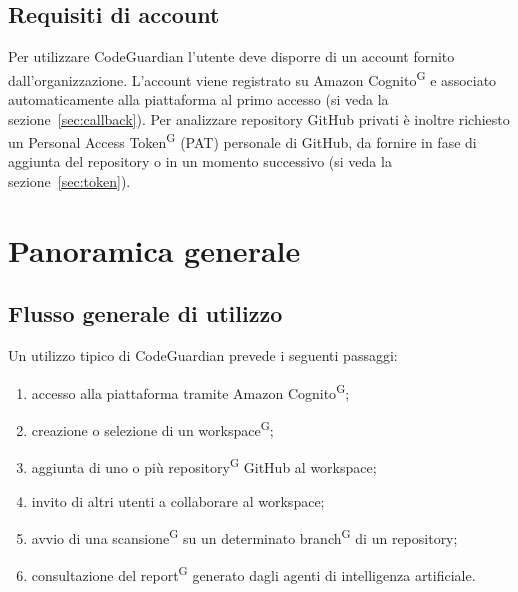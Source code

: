 \documentclass[a4paper, 11pt]{article}
\begin{document}
\subsection{Requisiti di account}
Per utilizzare CodeGuardian l'utente deve disporre di un account fornito dall'organizzazione. L'account viene registrato su Amazon Cognito\textsuperscript{G} e associato automaticamente alla piattaforma al primo accesso (si veda la sezione~\ref{sec:callback}).
Per analizzare repository GitHub privati è inoltre richiesto un Personal Access Token\textsuperscript{G} (PAT) personale di GitHub, da fornire in fase di aggiunta del repository o in un momento successivo (si veda la sezione~\ref{sec:token}).

\newpage
\section{Panoramica generale}

\subsection{Flusso generale di utilizzo}
Un utilizzo tipico di CodeGuardian prevede i seguenti passaggi:
\begin{enumerate}
    \item accesso alla piattaforma tramite Amazon Cognito\textsuperscript{G};
    \item creazione o selezione di un workspace\textsuperscript{G};
    \item aggiunta di uno o più repository\textsuperscript{G} GitHub al workspace;
    \item invito di altri utenti a collaborare al workspace;
    \item avvio di una scansione\textsuperscript{G} su un determinato branch\textsuperscript{G} di un repository;
    \item consultazione del report\textsuperscript{G} generato dagli agenti di intelligenza artificiale.
\end{enumerate}
\end{document}
